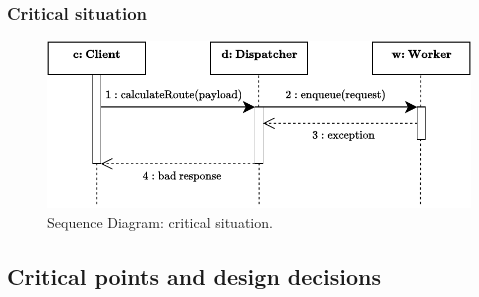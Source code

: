 \documentclass[a4paper]{article}
\begin{document}
    \newpage

    \subsubsection*{Critical situation}

    \begin{figure}[!htp]
        \centering
        \includegraphics[width=\textwidth]{img/sequence-diagram-4.pdf}
        \caption{Sequence Diagram: critical situation.}
    \end{figure}



    \newpage

    \subsection{Critical points and design decisions}\label{subsection: Critical points and design decisions}
\end{document}
